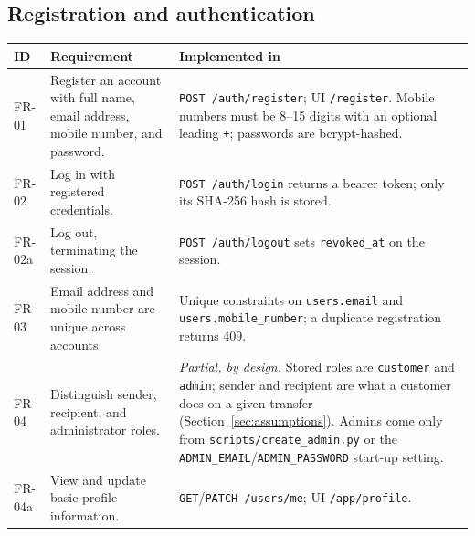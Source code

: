 \documentclass[11pt]{article}
\begin{document}
\newcommand{\frtable}[1]{%
\footnotesize
\begin{longtable}{@{}>{\raggedright\arraybackslash}p{0.075\textwidth}>{\raggedright\arraybackslash}p{0.42\textwidth}>{\raggedright\arraybackslash}p{0.465\textwidth}@{}}
\toprule
\textbf{ID} & \textbf{Requirement} & \textbf{Implemented in} \\
\midrule
\endhead
#1
\bottomrule
\end{longtable}
\normalsize
}

\subsection{Registration and authentication}
\frtable{%
FR-01 & Register an account with full name, email address, mobile number, and password. &
\texttt{POST /auth/register}; UI \texttt{/register}. Mobile numbers must be 8--15 digits with an optional leading \texttt{+}; passwords are bcrypt-hashed. \\
FR-02 & Log in with registered credentials. &
\texttt{POST /auth/login} returns a bearer token; only its SHA-256 hash is stored. \\
FR-02a & Log out, terminating the session. &
\texttt{POST /auth/logout} sets \texttt{revoked\_at} on the session. \\
FR-03 & Email address and mobile number are unique across accounts. &
Unique constraints on \texttt{users.email} and \texttt{users.mobile\_number}; a duplicate registration returns 409. \\
FR-04 & Distinguish sender, recipient, and administrator roles. &
\emph{Partial, by design.} Stored roles are \texttt{customer} and \texttt{admin}; sender and recipient are what a customer does on a given transfer (Section~\ref{sec:assumptions}). Admins come only from \texttt{scripts/create\_admin.py} or the \texttt{ADMIN\_EMAIL}/\texttt{ADMIN\_PASSWORD} start-up setting. \\
FR-04a & View and update basic profile information. &
\texttt{GET}/\texttt{PATCH /users/me}; UI \texttt{/app/profile}. \\
}
\end{document}
